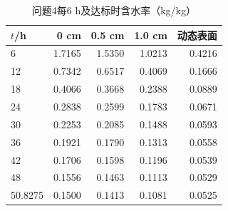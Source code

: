 \begin{table}[!htbp]\centering
\caption{问题4每6 h及达标时含水率（kg/kg）}
\begin{tabular}{lrrrr}\toprule
$t$/h & 0 cm & 0.5 cm & 1.0 cm & 动态表面\\\midrule
6 & 1.7165 & 1.5350 & 1.0213 & 0.4216\\
12 & 0.7342 & 0.6517 & 0.4069 & 0.1666\\
18 & 0.4066 & 0.3668 & 0.2388 & 0.0889\\
24 & 0.2838 & 0.2599 & 0.1783 & 0.0671\\
30 & 0.2253 & 0.2085 & 0.1488 & 0.0593\\
36 & 0.1921 & 0.1790 & 0.1313 & 0.0558\\
42 & 0.1706 & 0.1598 & 0.1196 & 0.0539\\
48 & 0.1556 & 0.1463 & 0.1113 & 0.0529\\
50.8275 & 0.1500 & 0.1413 & 0.1081 & 0.0525\\
\bottomrule\end{tabular}\end{table}
